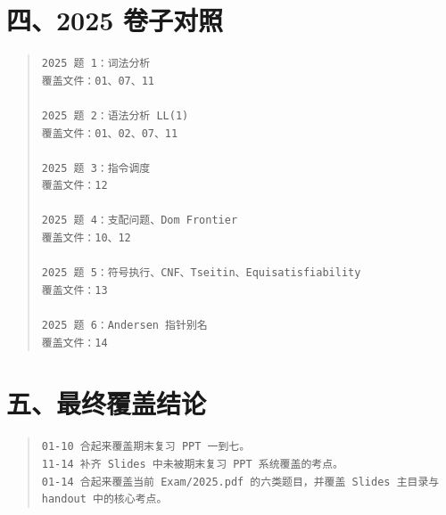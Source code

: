 \documentclass[UTF8,zihao=-4]{ctexart}
\begin{document}
\section*{四、2025 卷子对照}


\begin{quote}
\footnotesize
\begin{verbatim}
2025 题 1：词法分析
覆盖文件：01、07、11

2025 题 2：语法分析 LL(1)
覆盖文件：01、02、07、11

2025 题 3：指令调度
覆盖文件：12

2025 题 4：支配问题、Dom Frontier
覆盖文件：10、12

2025 题 5：符号执行、CNF、Tseitin、Equisatisfiability
覆盖文件：13

2025 题 6：Andersen 指针别名
覆盖文件：14
\end{verbatim}
\end{quote}

\section*{五、最终覆盖结论}


\begin{quote}
\footnotesize
\begin{verbatim}
01-10 合起来覆盖期末复习 PPT 一到七。
11-14 补齐 Slides 中未被期末复习 PPT 系统覆盖的考点。
01-14 合起来覆盖当前 Exam/2025.pdf 的六类题目，并覆盖 Slides 主目录与 handout 中的核心考点。
\end{verbatim}
\end{quote}
\end{document}
